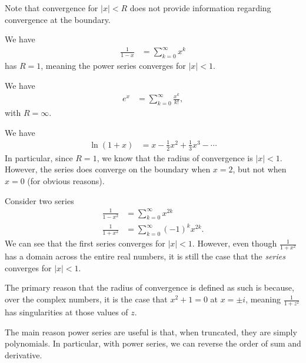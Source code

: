 \documentclass[10pt]{mypackage}
\begin{document}
  Note that convergence for $|x| < R$ does not provide information regarding convergence at the boundary.
\begin{example}
  We have
  \begin{align*}
    \frac{1}{1-x} &= \sum_{k=0}^{\infty}x^k
  \end{align*}
  has $R = 1$, meaning the power series converges for $|x| < 1$.
\end{example}
\begin{example}
  We have
  \begin{align*}
    e^{x} &= \sum_{k=0}^{\infty}\frac{x^k}{k!},
  \end{align*}
  with $R = \infty$.
\end{example}
\begin{example}
  We have
  \begin{align*}
    \ln\left(1+x\right) &= x - \frac{1}{2}x^2 + \frac{1}{3}x^{3} - \cdots
  \end{align*}
  In particular, since $R = 1$, we know that the radius of convergence is $|x| < 1$. However, the series does converge on the boundary when $x = 2$, but not when $x =0$ (for obvious reasons).
\end{example}
\begin{example}
  Consider two series
  \begin{align*}
    \frac{1}{1-x^2} &= \sum_{k=0}^{\infty}x^{2k}\\
    \frac{1}{1+x^2} &= \sum_{k=0}^{\infty}\left(-1\right)^{k}x^{2k}.
  \end{align*}
  We can see that the first series converges for $|x| < 1$. However, even though $\frac{1}{1+x^2}$ has a domain across the entire real numbers, it is still the case that the \textit{series} converges for $|x| < 1$.\newline

  The primary reason that the radius of convergence is defined as such is because, over the complex numbers, it is the case that $x^2 + 1 = 0$ at $x = \pm i$, meaning $\frac{1}{1+z^2}$ has singularities at those values of $z$.
\end{example}
The main reason power series are useful is that, when truncated, they are simply polynomials. In particular, with power series, we can reverse the order of sum and derivative.
\end{document}
